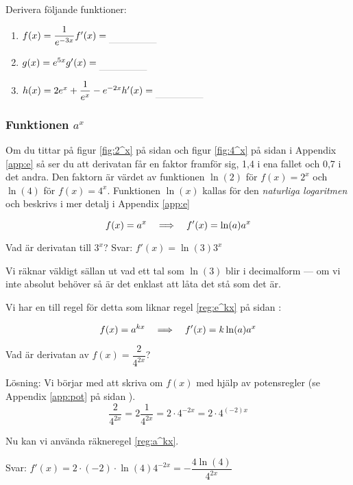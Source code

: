\documentclass[a4paper, 12pt]{article}
\begin{document}
\begin{uppgifter}
    \label{upp:e^kx}
    Derivera följande funktioner:
    \begin{multicols}{3}
        \begin{enumerate}
            \item $f(x) = \dfrac{1}{e^{-3x}} \\ f'(x) \ans$
            \item $g(x) = e^{5x} \\ g'(x) \ans$
            \item $h(x) = 2e^x + \dfrac 1{e^x} - e^{-2x} \\ h'(x) \ans$
        \end{enumerate}
    \end{multicols}
\end{uppgifter}

\subsubsection{Funktionen $a^x$}
Om du tittar på figur \ref*{fig:2^x} på sidan \pageref*{fig:2^x} och figur \ref*{fig:4^x} på sidan \pageref*{fig:4^x} i Appendix \ref*{app:e} så ser du att derivatan får en faktor framför sig, 1,4 i ena fallet och 0,7 i det andra. Den faktorn är värdet av funktionen $\ln(2)$ för $f(x) = 2^x$ och $\ln(4)$ för $f(x) = 4^x$. Funktionen $\ln (x)$ kallas för den \emph{naturliga logaritmen} och beskrivs i mer detalj i Appendix \ref*{app:e}


\begin{regel}
    \label{reg:a^x}
    \[f(x) = a^x \hspace{1em} \Longrightarrow \hspace{1em} f'(x) = \ln (a) a^x \]
\end{regel}


\begin{exempel}
    \label{ex:a^x}
    Vad är derivatan till $3^x$?
    Svar: $f'(x) = \ln (3) 3^x$
\end{exempel}

Vi räknar väldigt sällan ut vad ett tal som $\ln(3)$ blir i decimalform --- om vi inte absolut behöver så är det enklast att låta det stå som det är.

Vi har en till regel för detta som liknar regel \ref*{reg:e^kx} på sidan \pageref*{reg:e^kx}:

\begin{regel}
    \label{reg:a^kx}
    \[f(x) = a^{kx} \hspace{1em} \Longrightarrow \hspace{1em} f'(x) = k\ln(a)a^x\]
\end{regel}


\begin{exempel}
    Vad är derivatan av $f(x) = \dfrac 2{4^{2x}}$?
    
    Lösning: Vi börjar med att skriva om $f(x)$ med hjälp av potensregler (se Appendix \ref*{app:pot} på sidan \pageref*{app:pot}).
    \[\dfrac{2}{4^{2x}} = 2\dfrac{1}{4^{2x}} = 2\cdot 4^{-2x} = 2\cdot 4^{(-2)x}\]

    Nu kan vi använda räkneregel \ref*{reg:a^kx}.

    Svar: $f'(x) = 2\cdot (-2) \cdot \ln(4) 4^{-2x} = - \dfrac {4\ln(4)} {4^{2x}}$
\end{exempel}
\end{document}
